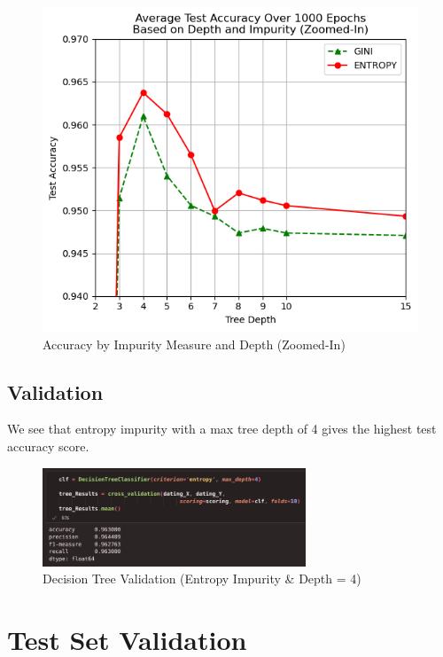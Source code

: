 \documentclass{article}
\begin{document}
\begin{figure}[H]
\begin{minipage}[t]{0.49\textwidth}
            \includegraphics[width=\textwidth, height=0.25\textheight]{tree_selection2.png}
            \caption{\small{Accuracy by Impurity Measure and Depth (Zoomed-In)}}
        \end{minipage}
    \end{figure}

    \newpage

    \subsection*{Validation}

    We see that entropy impurity with a max tree depth of 4 gives the highest test
    accuracy score.

    \begin{figure}[H]
        \centering
        \includegraphics[width=0.7\textwidth, height=0.17\textheight]{tree_validation.png}
        \caption{\small{Decision Tree Validation (Entropy Impurity \& Depth = 4)}}
    \end{figure}

\section*{Test Set Validation}
\end{document}
